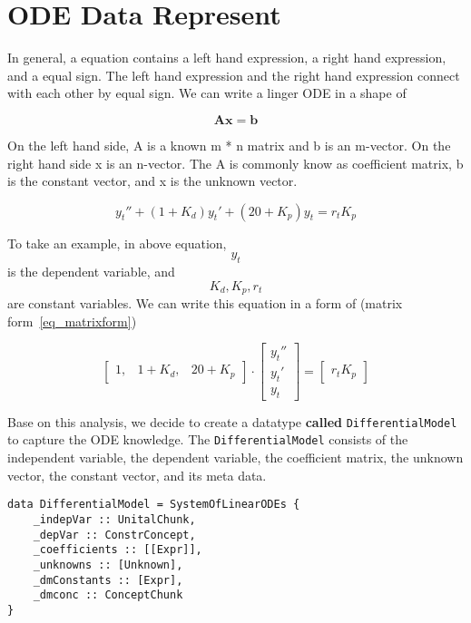 \chapter{ODE Data Represent}
In general, a equation contains a left hand expression, a right hand expression, and a equal sign. The left hand expression and the right hand expression connect with each other by equal sign. We can write a linger ODE in a shape of

\begin{equation} \label{eq_matrixform}
	\boldsymbol{Ax} = \boldsymbol{b}
\end{equation}

On the left hand side, A is a known m * n matrix and b is an m-vector. On the right hand side x is an n-vector. The A is commonly know as coefficient matrix, b is the constant vector, and x is the unknown vector.

\begin{equation} \label{eq_odeexmaple}
	y_t'' + (1 + K_d)y_t' + (20 + K_p)y_t = r_t K_p
\end{equation}

To take an example, in above equation, \[y_t\] is the dependent variable, and \[K_d, K_p, r_t\] are constant variables. We can write this equation in a form of (matrix form~\ref{eq_matrixform})

\[
\begin{bmatrix}
    1, & 1 + K_{d}, & 20 + K_{p}
\end{bmatrix}
\cdot
\begin{bmatrix}
    y_{t}''  \\
    y_{t}'   \\
    y_{t}  
\end{bmatrix}
=
\begin{bmatrix}
    r_{t} K_{p} 
\end{bmatrix}
\]

Base on this analysis, we decide to create a datatype \textbf{called} \verb|DifferentialModel| to capture the ODE knowledge. The \verb|DifferentialModel| consists of the independent variable, the dependent variable, the coefficient matrix, the unknown vector, the constant vector, and its meta data.

\begin{lstlisting}[language=HaskellUlisses, frame=single]
data DifferentialModel = SystemOfLinearODEs {
	_indepVar :: UnitalChunk,
	_depVar :: ConstrConcept,
	_coefficients :: [[Expr]],
	_unknowns :: [Unknown],
	_dmConstants :: [Expr],
	_dmconc :: ConceptChunk
}
\end{lstlisting}

